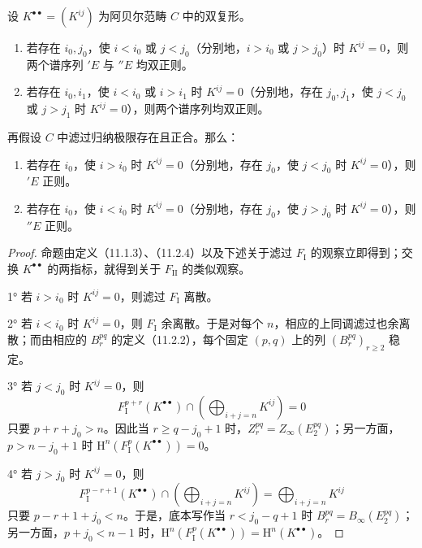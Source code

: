 设 $K^{\bullet\bullet}=(K^{ij})$ 为阿贝尔范畴 $C$ 中的双复形。
\begin{enumerate}[label=(\roman*)]
\item 若存在 $i_0,j_0$，使 $i<i_0$ 或 $j<j_0$（分别地，$i>i_0$ 或 $j>j_0$）时 $K^{ij}=0$，则两个谱序列 $'E$ 与 $''E$ 均双正则。
\item 若存在 $i_0,i_1$，使 $i<i_0$ 或 $i>i_1$ 时 $K^{ij}=0$（分别地，存在 $j_0,j_1$，使 $j<j_0$ 或 $j>j_1$ 时 $K^{ij}=0$），则两个谱序列均双正则。
\end{enumerate}
再假设 $C$ 中滤过归纳极限存在且正合。那么：
\begin{enumerate}[label=(\roman*),start=3]
\item 若存在 $i_0$，使 $i>i_0$ 时 $K^{ij}=0$（分别地，存在 $j_0$，使 $j<j_0$ 时 $K^{ij}=0$），则 $'E$ 正则。
\item 若存在 $i_0$，使 $i<i_0$ 时 $K^{ij}=0$（分别地，存在 $j_0$，使 $j>j_0$ 时 $K^{ij}=0$），则 $''E$ 正则。
\end{enumerate}
\begin{proof}
命题由定义（11.1.3）、（11.2.4）以及下述关于滤过 $F_{\mathrm I}$ 的观察立即得到；交换 $K^{\bullet\bullet}$ 的两指标，就得到关于 $F_{\mathrm{II}}$ 的类似观察。

1° 若 $i>i_0$ 时 $K^{ij}=0$，则滤过 $F_{\mathrm I}$ 离散。

2° 若 $i<i_0$ 时 $K^{ij}=0$，则 $F_{\mathrm I}$ 余离散。于是对每个 $n$，相应的上同调滤过也余离散；而由相应的 $B_r^{pq}$ 的定义（11.2.2），每个固定 $(p,q)$ 上的列 $(B_r^{pq})_{r\geq2}$ 稳定。

3° 若 $j<j_0$ 时 $K^{ij}=0$，则
\[
F_{\mathrm I}^{p+r}(K^{\bullet\bullet})\cap\left(\bigoplus_{i+j=n}K^{ij}\right)=0
\]
只要 $p+r+j_0>n$。因此当 $r\geq q-j_0+1$ 时，$Z_r^{pq}=Z_\infty(E_2^{pq})$；另一方面，$p>n-j_0+1$ 时 $\mathrm H^n(F_{\mathrm I}^p(K^{\bullet\bullet}))=0$。

4° 若 $j>j_0$ 时 $K^{ij}=0$，则
\[
F_{\mathrm I}^{p-r+1}(K^{\bullet\bullet})\cap\left(\bigoplus_{i+j=n}K^{ij}\right)
=\bigoplus_{i+j=n}K^{ij}
\]
只要 $p-r+1+j_0<n$。于是，底本写作当 $r<j_0-q+1$ 时 $B_r^{pq}=B_\infty(E_2^{pq})$；另一方面，$p+j_0<n-1$ 时，$\mathrm H^n(F_{\mathrm I}^p(K^{\bullet\bullet}))=\mathrm H^n(K^{\bullet\bullet})$。
\end{proof}


